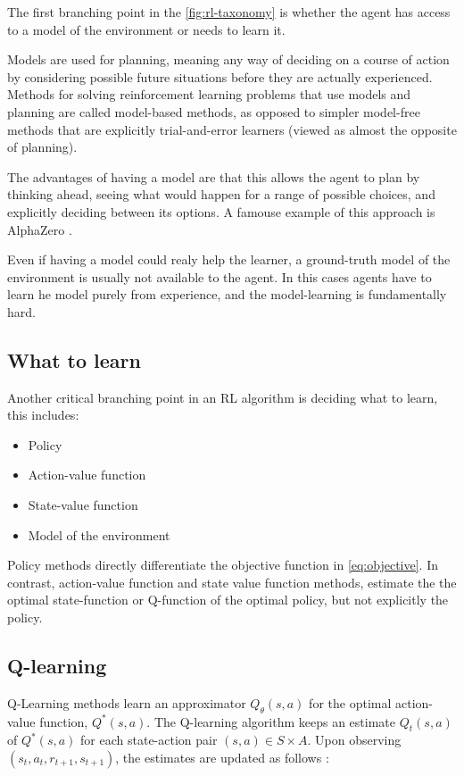 \documentclass{article}
\begin{document}
The first branching point in the \autoref{fig:rl-taxonomy} is whether the agent has access to a model  of the environment or needs to learn it.

Models are used for planning, meaning any way of deciding on a course of action by considering possible future situations before they are actually experienced. Methods for solving reinforcement learning problems that use models and planning are called model-based methods, as opposed to simpler model-free methods that are explicitly trial-and-error learners (viewed as almost the opposite of planning).

The advantages of having a model are that this allows the agent to plan by thinking ahead, seeing what would happen for a range of possible choices, and explicitly deciding between its options. A famouse example of this approach is AlphaZero \cite{silver2017mastering}.

Even if having a model could realy help the learner, a ground-truth model of the environment is usually not available to the agent. In this cases agents have to learn he model purely from experience, and the model-learning is fundamentally hard.

\subsection{What to learn}

Another critical branching point in an RL algorithm is deciding what to learn, this includes:
\begin{itemize}
	\item Policy
	\item Action-value function
	\item State-value function
	\item Model of the environment
\end{itemize}

Policy methods directly differentiate the objective function in \autoref{eq:objective}. In contrast, action-value function and state value function methods, estimate the the optimal state-function or Q-function of the optimal policy, but not explicitly the policy.


\subsection{Q-learning}


Q-Learning methods learn an approximator $Q_{\theta}(s,a)$ for the optimal action-value function, $Q^*(s,a)$. The Q-learning algorithm keeps an estimate $Q_t(s,a)$ of $Q^*(s,a)$ for each state-action pair $(s,a) \in S \times A$. Upon observing $(s_t, a_t, r_{t+1}, s_{t+1})$, the estimates are updated as follows \cite{series/synthesis/2010Szepesvari}:
\end{document}
